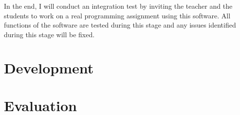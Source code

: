 \documentclass[a4paper]{report}
\begin{document}
In the end, I will conduct an integration test by inviting the teacher and the students to work on a real programming assignment using this software. All functions of the software are tested during this stage and any issues identified during this stage will be fixed.

\chapter{Development}

\chapter{Evaluation}
\end{document}
